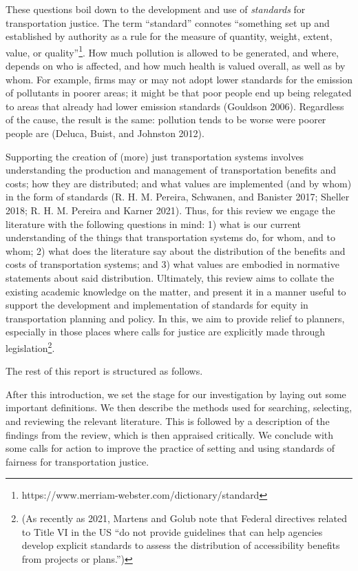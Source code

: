 \documentclass[12pt, oneside]{report}
\begin{document}
These questions boil down to the development and use of \emph{standards}
for transportation justice. The term ``standard'' connotes ``something
set up and established by authority as a rule for the measure of
quantity, weight, extent, value, or quality''\footnote{https://www.merriam-webster.com/dictionary/standard}.
How much pollution is allowed to be generated, and where, depends on who
is affected, and how much health is valued overall, as well as by whom.
For example, firms may or may not adopt lower standards for the emission
of pollutants in poorer areas; it might be that poor people end up being
relegated to areas that already had lower emission standards (Gouldson
2006). Regardless of the cause, the result is the same: pollution tends
to be worse were poorer people are (Deluca, Buist, and Johnston 2012).

Supporting the creation of (more) just transportation systems involves
understanding the production and management of transportation benefits
and costs; how they are distributed; and what values are implemented
(and by whom) in the form of standards (R. H. M. Pereira, Schwanen, and
Banister 2017; Sheller 2018; R. H. M. Pereira and Karner 2021). Thus,
for this review we engage the literature with the following questions in
mind: 1) what is our current understanding of the things that
transportation systems do, for whom, and to whom; 2) what does the
literature say about the distribution of the benefits and costs of
transportation systems; and 3) what values are embodied in normative
statements about said distribution. Ultimately, this review aims to
collate the existing academic knowledge on the matter, and present it in
a manner useful to support the development and implementation of
standards for equity in transportation planning and policy. In this, we
aim to provide relief to planners, especially in those places where
calls for justice are explicitly made through legislation\footnote{(As
  recently as 2021, Martens and Golub note that Federal directives
  related to Title VI in the US ``do not provide guidelines that can
  help agencies develop explicit standards to assess the distribution of
  accessibility benefits from projects or plans.'')}.

The rest of this report is structured as follows.

After this introduction, we set the stage for our investigation by
laying out some important definitions. We then describe the methods used
for searching, selecting, and reviewing the relevant literature. This is
followed by a description of the findings from the review, which is then
appraised critically. We conclude with some calls for action to improve
the practice of setting and using standards of fairness for
transportation justice.
\end{document}
